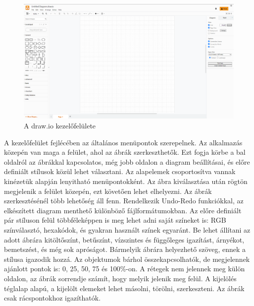 










\begin{figure}[!h]
	\includegraphics[width=\textwidth]{images/drawio.png}
	\caption{A draw.io kezelőfelülete}
\label{fig:drawio}
\end{figure}
A kezelőfelület fejlécében az általános menüpontok szerepelnek. Az alkalmazás közepén van maga a felület, ahol az ábrák szerkeszthetők. Ezt fogja körbe a bal oldalról az ábrákkal kapcsolatos, még jobb oldalon a diagram beállításai, és előre definiált stílusok közül lehet választani. Az alapelemek csoportosítva vannak kinézetük alapján lenyitható menüpontokként. Az ábra kiválasztása után rögtön megjelenik a felület közepén, ezt követően lehet elhelyezni. Az ábrák szerkesztésénél több lehetőség áll fenn. Rendelkezik Undo-Redo funkciókkal, az elkészített diagram menthető különböző fájlformátumokban. Az előre definiált pár stíluson felül többféleképpen is meg lehet adni saját színeket is: RGB színválasztó, hexakódok, és gyakran használt színek egyaránt. Be lehet állítani az adott ábrára kitöltőszínt, betűszínt, vízszintes és függőleges igazítást, árnyékot, bemetszést, és még sok apróságot. Bármelyik ábrára helyezhető szöveg, ennek a stílusa igazodik hozzá. Az objektumok bárhol összekapcsolhatók, de megjelennek ajánlott pontok is: 0, 25, 50, 75 és 100\%-on. A rétegek nem jelennek meg külön oldalon, az ábrák sorrendje számít, hogy melyik jelenik meg felül. A kijelölés téglalap alapú, a kijelölt elemeket lehet másolni, törölni, szerkeszteni. Az ábrák csak rácspontokhoz igazíthatók.



